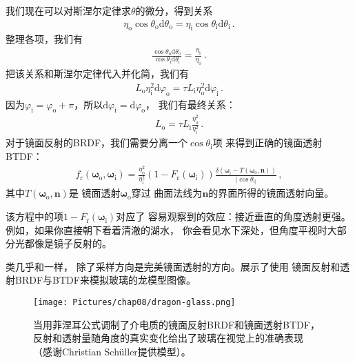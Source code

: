 我们现在可以对斯涅尔定律求$\theta$的微分，得到关系
\begin{align*}
    \eta_{\mathrm{o}}\cos\theta_{\mathrm{o}}\mathrm{d}\theta_{\mathrm{o}}=\eta_{\mathrm{i}}\cos\theta_{\mathrm{i}}\mathrm{d}\theta_{\mathrm{i}}\, .
\end{align*}
整理各项，我们有
\begin{align*}
    \frac{\cos\theta_{\mathrm{o}}\mathrm{d}\theta_{\mathrm{o}}}{\cos\theta_{\mathrm{i}}\mathrm{d}\theta_{\mathrm{i}}}=\frac{\eta_{\mathrm{i}}}{\eta_{\mathrm{o}}}\, .
\end{align*}
把该关系和斯涅尔定律代入并化简，我们有
\begin{align*}
    L_{\mathrm{o}}\eta_{\mathrm{i}}^2\mathrm{d}\varphi_{\mathrm{o}}=\tau L_{\mathrm{i}}\eta_{\mathrm{o}}^2\mathrm{d}\varphi_{\mathrm{i}}\, .
\end{align*}
因为$\varphi_{\mathrm{i}}=\varphi_{\mathrm{o}}+\pi$，所以$\mathrm{d}\varphi_{\mathrm{i}}=\mathrm{d}\varphi_{\mathrm{o}}$，
我们有最终关系：
\begin{align}
    \label{eq:8.7}
    L_{\mathrm{o}}=\tau L_{\mathrm{i}}\frac{\eta_{\mathrm{o}}^2}{\eta_{\mathrm{i}}^2}\, .
\end{align}
对于镜面反射的BRDF，我们需要分离一个$\cos\theta_{\mathrm{i}}$项
来得到正确的镜面透射BTDF：
\begin{align*}
    f_{\mathrm{r}}({\bm\omega}_{\mathrm{o}},{\bm\omega}_{\mathrm{i}})=\frac{\eta_{\mathrm{o}}^2}{\eta_{\mathrm{i}}^2}(1-F_{\mathrm{r}}({\bm\omega}_{\mathrm{i}}))\frac{\delta({\bm\omega}_{\mathrm{i}}-T({\bm\omega}_{\mathrm{o}},{\bm n}))}{|\cos\theta_{\mathrm{i}|}}\, ,
\end{align*}
其中$T({\bm\omega}_{\mathrm{o}},{\bm n})$是
镜面透射${\bm\omega}_{\mathrm{o}}$穿过
曲面法线为$\bm n$的界面所得的镜面透射向量。

该方程中的项$1-F_{\mathrm{r}}({\bm\omega}_{\mathrm{i}})$对应了
容易观察到的效应：接近垂直的角度透射更强。例如，如果你直接朝下看着清澈的湖水，
你会看见水下深处，但角度平视时大部分光都像是镜子反射的。

类几乎和一样，
除了采样方向是完美镜面透射的方向。展示了使用
镜面反射和透射BRDF与BTDF来模拟玻璃的龙模型图像。
\begin{figure}[htbp]
    \centering
    \texttt{[image: Pictures/chap08/dragon-glass.png]}
    \caption{当用菲涅耳公式调制了介电质的镜面反射BRDF和镜面透射BTDF，
        反射和透射量随角度的真实变化给出了玻璃在视觉上的准确表现
        （感谢Christian Schüller提供模型）。}
    \label{fig:8.10}
\end{figure}

